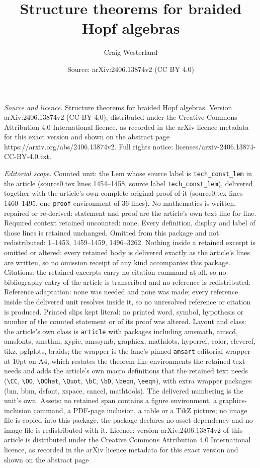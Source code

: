 \documentclass[10pt,a4paper]{amsart}
\title[Structure theorems for braided Hopf algebras]{Structure theorems for braided Hopf algebras}
\author{Craig Westerland}
\date{Source: arXiv:2406.13874v2 (CC BY 4.0)}
\begin{document}
\maketitle

\noindent\emph{Source and licence.} Structure theorems for braided Hopf algebras. Version arXiv:2406.13874v2 (CC BY 4.0), distributed under the Creative Commons Attribution 4.0 International licence, as recorded in the arXiv licence metadata for this exact version and shown on the abstract page https://arxiv.org/abs/2406.13874v2. Full rights notice: licenses/arxiv-2406.13874-CC-BY-4.0.txt.\par\smallskip

\noindent\textit{Editorial scope.} Counted unit: the Lem whose source label is \texttt{tech\_const\_lem} in the article (source0.tex lines 1454--1458, source label \texttt{tech\_const\_lem}), delivered together with the article's own complete original proof of it (source0.tex lines 1460--1495, one \texttt{proof} environment of 36 lines). No mathematics is written, repaired or re-derived: statement and proof are the article's own text line for line. Required context retained uncounted: none. Every definition, display and label of those lines is retained unchanged. Omitted from this package and not redistributed: 1--1453, 1459--1459, 1496--3262. Nothing inside a retained excerpt is omitted or altered: every retained body is delivered exactly as the article's lines are written, so no omission receipt of any kind accompanies this package. Citations: the retained excerpts carry no citation command at all, so no bibliography entry of the article is transcribed and no reference is redistributed. Reference adaptation: none was needed and none was made; every reference inside the delivered unit resolves inside it, so no unresolved reference or citation is produced. Printed slips kept literal: no printed word, symbol, hypothesis or number of the counted statement or of its proof was altered. Layout and class: the article's own class is \texttt{article} with packages including amsmath, amscd, amsfonts, amsthm, xypic, amssymb, graphicx, mathdots, hyperref, color, cleveref, tikz, pgfplots, braids; the wrapper is the lane's pinned \texttt{amsart} editorial wrapper at 10pt on A4, which restates the theorem-like environments the retained text needs and adds the article's own macro definitions that the retained text needs (\texttt{\textbackslash CC}, \texttt{\textbackslash OO}, \texttt{\textbackslash OOhat}, \texttt{\textbackslash Quot}, \texttt{\textbackslash bC}, \texttt{\textbackslash bD}, \texttt{\textbackslash beqn}, \texttt{\textbackslash eeqn}), with extra wrapper packages (bm, bbm, dsfont, xspace, cancel, mathtools). The delivered numbering is the unit's own. Assets: no retained span contains a figure environment, a graphics-inclusion command, a PDF-page inclusion, a table or a TikZ picture; no image file is copied into this package, the package declares no asset dependency and no image file is redistributed with it. Licence: version arXiv:2406.13874v2 of this article is distributed under the Creative Commons Attribution 4.0 International licence, as recorded in the arXiv licence metadata for this exact version and shown on the abstract page 
\end{document}
